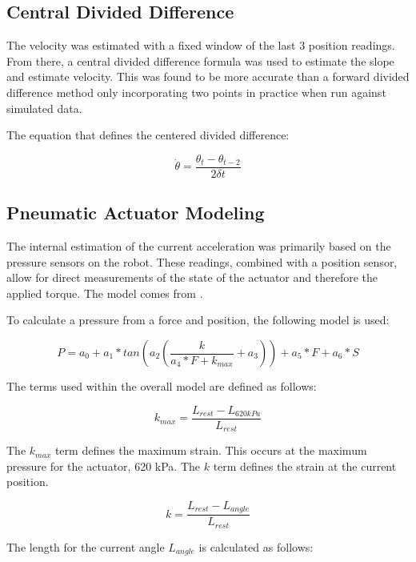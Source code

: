 \subsection{Central Divided Difference}

The velocity was estimated with a fixed window of the last 3 position readings.
From there, a central divided difference formula was used to estimate the
slope and estimate velocity. This was found to be more accurate than a forward
divided difference method only incorporating two points in practice when run
against simulated data.

The equation that defines the centered divided difference:

\begin{equation}
\dot{\theta} = \dfrac{\theta_{t} - \theta_{t - 2}}{2 \delta t}
\end{equation}

\subsection{Pneumatic Actuator Modeling}

The internal estimation of the current acceleration was primarily based on the 
pressure sensors on the robot. These readings, combined with a position sensor, 
allow for direct measurements of the state of the actuator and therefore the
applied torque. The model comes from \cite{HuntPMuscles}.

To calculate a pressure from a force and position, the following model is used:

\begin{equation}
P = a_{0} + a_{1} * tan(a_{2} (\dfrac{k}{a_{4} * F + k_{max}} + a_{3})) + a_{5} * F + a_{6} * S
\end{equation}

The terms used within the overall model are defined as follows:

\begin{equation}
k_{max} = \dfrac{L_{rest} - L_{620 kPa}}{L_{rest}}
\end{equation}

The $k_{max}$ term defines the maximum strain. This occurs at the maximum pressure for the actuator, 620 kPa. The $k$ term defines the strain at the current position.

\begin{equation}
k = \dfrac{L_{rest} - L_{angle}}{L_{rest}}
\end{equation}

The length for the current angle $L_{angle}$ is calculated as follows:


